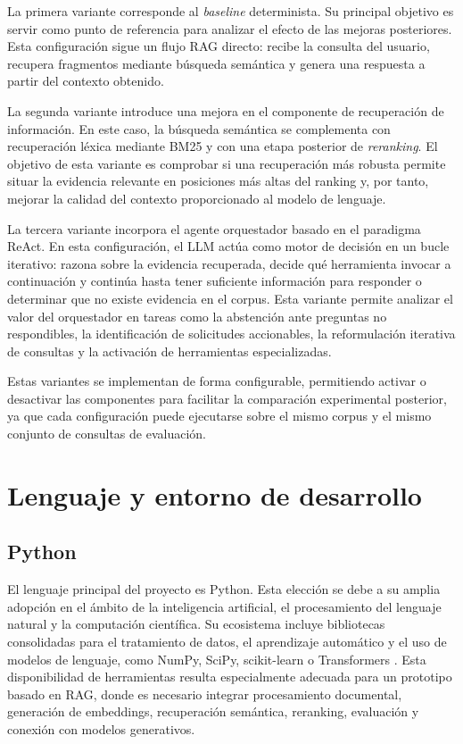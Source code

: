 La primera variante corresponde al \textit{baseline} determinista. Su principal objetivo es servir como punto de referencia para analizar el efecto de las mejoras posteriores.
Esta configuración sigue un flujo RAG directo: recibe la consulta del usuario, recupera fragmentos mediante búsqueda semántica y genera una respuesta a partir del contexto obtenido. 

La segunda variante introduce una mejora en el componente de recuperación de información. 
En este caso, la búsqueda semántica se complementa con recuperación léxica mediante BM25 y con una etapa posterior de \textit{reranking}. 
El objetivo de esta variante es comprobar si una recuperación más robusta permite situar la evidencia relevante en posiciones más altas del ranking y, por tanto, mejorar la calidad del contexto proporcionado al modelo de lenguaje.

La tercera variante incorpora el agente orquestador basado en el paradigma ReAct.
En esta configuración, el LLM actúa como motor de decisión en un bucle iterativo: razona sobre la evidencia recuperada, decide qué herramienta invocar a continuación y continúa hasta tener suficiente información para responder o determinar que no existe evidencia en el corpus.
Esta variante permite analizar el valor del orquestador en tareas como la abstención ante preguntas no respondibles, la identificación de solicitudes accionables, la reformulación iterativa de consultas y la activación de herramientas especializadas.

Estas variantes se implementan de forma configurable, permitiendo activar o desactivar las componentes para facilitar la comparación experimental posterior, ya que cada configuración puede ejecutarse sobre el mismo corpus y el mismo conjunto de consultas de evaluación.


\section{Lenguaje y entorno de desarrollo}\label{sec:entorno-desarrollo}

\subsection{Python}\label{subsec:python}

El lenguaje principal del proyecto es Python. 
Esta elección se debe a su amplia adopción en el ámbito de la inteligencia artificial, el procesamiento del lenguaje natural y la computación científica. 
Su ecosistema incluye bibliotecas consolidadas para el tratamiento de datos, el aprendizaje automático y el uso de modelos de lenguaje, como NumPy, SciPy, scikit-learn o Transformers \cite{harris2020array, virtanen2020scipy, pedregosa2011scikit, wolf2020transformers}. 
Esta disponibilidad de herramientas resulta especialmente adecuada para un prototipo basado en RAG, donde es necesario integrar procesamiento documental, generación de embeddings, recuperación semántica, reranking, evaluación y conexión con modelos generativos.

